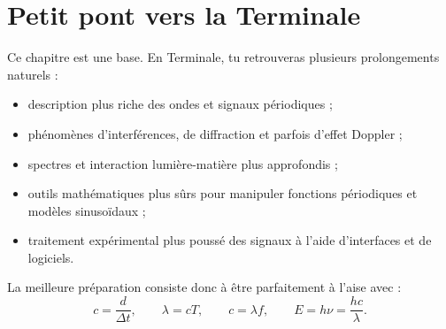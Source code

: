 \documentclass[11pt,a4paper]{article}
\begin{document}
\section*{Petit pont vers la Terminale}
Ce chapitre est une base. En Terminale, tu retrouveras plusieurs prolongements naturels :
\begin{itemize}
    \item description plus riche des ondes et signaux périodiques ;
    \item phénomènes d'interférences, de diffraction et parfois d'effet Doppler ;
    \item spectres et interaction lumière-matière plus approfondis ;
    \item outils mathématiques plus sûrs pour manipuler fonctions périodiques et modèles sinusoïdaux ;
    \item traitement expérimental plus poussé des signaux à l'aide d'interfaces et de logiciels.
\end{itemize}
La meilleure préparation consiste donc à être parfaitement à l'aise avec :
\[
 c=\frac{d}{\Delta t}, \qquad \lambda=cT, \qquad c=\lambda f, \qquad E=h\nu=\frac{hc}{\lambda}.
\]
\end{document}
